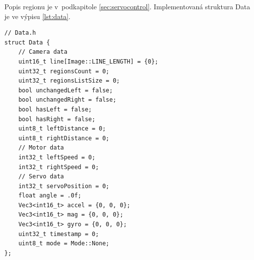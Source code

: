 Popis regionu je v~podkapitole \ref{sec:servocontrol}.
Implementovaná struktura Data je ve výpisu \ref{lst:data}.
\begin{lstlisting}[caption = Struktura Data, label = lst:data]
// Data.h
struct Data {
    // Camera data
    uint16_t line[Image::LINE_LENGTH] = {0};
    uint32_t regionsCount = 0;
    uint32_t regionsListSize = 0;
    bool unchangedLeft = false;
    bool unchangedRight = false;
    bool hasLeft = false;
    bool hasRight = false;
    uint8_t leftDistance = 0;
    uint8_t rightDistance = 0;
    // Motor data
    int32_t leftSpeed = 0;
    int32_t rightSpeed = 0;
    // Servo data
    int32_t servoPosition = 0;
    float angle = .0f;
    Vec3<int16_t> accel = {0, 0, 0};
    Vec3<int16_t> mag = {0, 0, 0};
    Vec3<int16_t> gyro = {0, 0, 0};
    uint32_t timestamp = 0;
    uint8_t mode = Mode::None;
};
\end{lstlisting}

\endinput